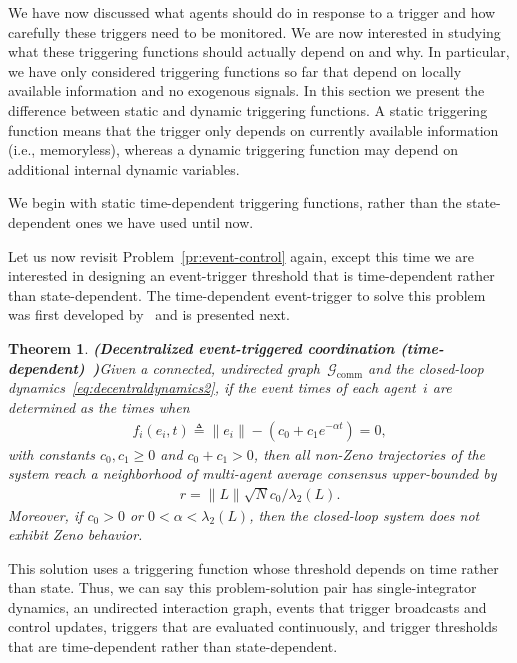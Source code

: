 \documentclass{autart}
\newtheorem{theorem}{Theorem}[section]
\newcommand{\GG}{{\mathcal{G}}}
\newcommand{\commgraph}{\GG_\text{comm}}
\newcommand{\TwoNorm}[1]{\|#1\|}
\newcommand{\longthmtitle}[1]{\mbox{}\textup{\textbf{(#1)}}}
\begin{document}
{We have now discussed what agents should do in response to a trigger
and how carefully these triggers need to be monitored. We are now
interested in studying what these triggering functions should actually
depend on and why. In particular, we have only considered triggering
functions so far that depend on locally available information and no
exogenous signals. In this section we present the difference between
static and dynamic triggering functions.  A static triggering function
means that the trigger only depends on currently available information
(i.e., memoryless), whereas a dynamic triggering function may depend
on additional internal dynamic variables.

We begin with static time-dependent triggering functions, rather than
the state-dependent ones we have used until now.} Let us now revisit
Problem~\ref{pr:event-control} again, except this time we are
interested in designing an event-trigger threshold that is
time-dependent rather than state-dependent. The time-dependent
event-trigger to solve this problem was first developed
by~\cite{GSS-DVD-KHJ:13} and is presented next.

\begin{theorem}\longthmtitle{Decentralized event-triggered
    coordination (time-dependent)~\citep{GSS-DVD-KHJ:13}}\label{th:time}
  Given {a connected, undirected graph~$\commgraph$ and} the
  closed-loop dynamics~\eqref{eq:decentraldynamics2}, if the event
  times of each agent~$i$ are determined as the times when
  \begin{align}
    f_i(e_i,t) \triangleq \TwoNorm{e_i} - (c_0 + c_1 e^{-\alpha
    t} ) = 0,
  \end{align}
  with constants $c_0, c_1 \geq 0$ and $c_0 + c_1 > 0$, then all
  non-Zeno trajectories of the system reach a neighborhood of
  multi-agent average consensus upper-bounded by
  \begin{align*}
    r = \TwoNorm{L} \sqrt{N} c_0 / \lambda_2(L) .
  \end{align*}
  Moreover, if $c_0 > 0$ or $0 < \alpha < \lambda_2(L)$, then the closed-loop
  system does not exhibit Zeno behavior.
\end{theorem}

This solution uses a triggering function whose threshold depends on
time rather than state. Thus, we can say this problem-solution pair
has single-integrator dynamics, an undirected interaction graph,
events that trigger broadcasts and control updates, triggers that are
evaluated continuously, and trigger thresholds that are time-dependent
rather than state-dependent. 
\end{document}
